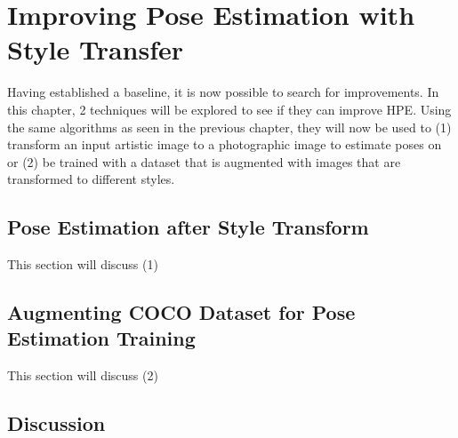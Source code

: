 \chapter{Improving Pose Estimation with Style Transfer}
\label{chap:improvements}
Having established a baseline, it is now possible to search for improvements.
In this chapter, 2 techniques will be explored to see if they can improve \gls{HPE}.
Using the same algorithms as seen in the previous chapter, they will now be used to
(1) transform an input artistic image to a photographic image to estimate poses on or
(2) be trained with a dataset that is augmented with images that are transformed to different styles.

\section{Pose Estimation after Style Transform}
This section will discuss (1)

\section{Augmenting COCO Dataset for Pose Estimation Training}
This section will discuss (2)

\section{Discussion}
